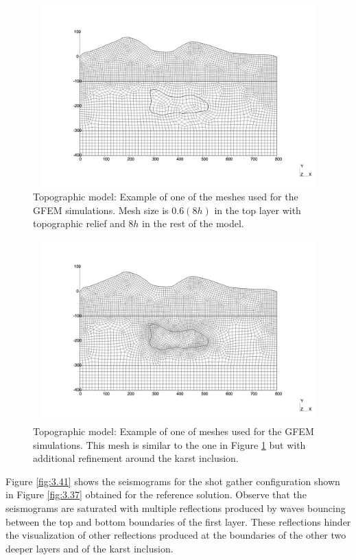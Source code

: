  \begin{figure}[h!]
	\centering
	\includegraphics[width=14cm, height=7cm]{Thesis_Edith/figures/topo/topo_meshr_8hv2.pdf}
	\caption{Topographic model: Example of one of the meshes used for the GFEM simulations. Mesh size is $0.6 (8h)$ in the top layer with topographic relief and $8h$ in the rest of the model.}
	\label{fig:3.39}
\end{figure}

 \begin{figure}[h!]
	\centering
	\includegraphics[width=14cm, height=7cm]{Thesis_Edith/figures/topo/topo_meshr_refv2.pdf}
	\caption{Topographic model: Example of one of meshes used for the GFEM simulations. This mesh is similar to the one in Figure \ref{fig:3.39} but with additional refinement around the karst inclusion.}
	\label{fig:3.40}
\end{figure}

\clearpage
Figure \ref{fig:3.41} shows the seismograms for the shot gather configuration shown in Figure \ref{fig:3.37} obtained for the reference solution. Observe that the seismograms are saturated with multiple reflections produced by waves bouncing between the top and bottom boundaries of the first layer. These reflections hinder the visualization of other reflections produced at the boundaries of the other two deeper layers and of the karst inclusion.

